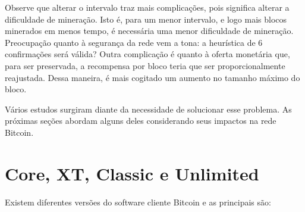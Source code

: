 Observe que alterar o intervalo traz mais complicações, pois significa alterar a dificuldade de mineração. Isto é, para um menor intervalo, e logo mais blocos minerados em menos tempo, é necessária uma menor dificuldade de mineração. Preocupação quanto à segurança da rede vem a tona: a heurística de 6 confirmações será válida? Outra complicação é quanto à oferta monetária que, para ser preservada, a recompensa por bloco teria que ser proporcionalmente reajustada. Dessa maneira, é mais cogitado um aumento no tamanho máximo do bloco.

Vários estudos surgiram diante da necessidade de solucionar esse problema. As próximas seções abordam alguns deles considerando seus impactos na rede Bitcoin.

\section{Core, XT, Classic e Unlimited}

Existem diferentes versões do software cliente Bitcoin e as principais são:

